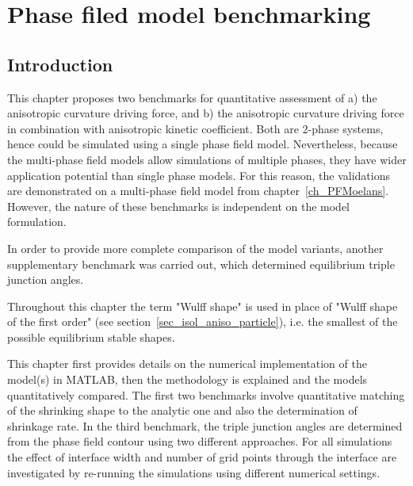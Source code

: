 \chapter{Phase filed model benchmarking}

\section{Introduction}
\label{sec_P1_Intro}

This chapter proposes two benchmarks for quantitative assessment of a) the anisotropic curvature driving force, and b) the anisotropic curvature driving force in combination with anisotropic kinetic coefficient. Both are 2-phase systems, hence could be simulated using a single phase field model. Nevertheless, because the multi-phase field models allow simulations of multiple phases, they have wider application potential than single phase models. For this reason, the validations are demonstrated on a multi-phase field model from chapter~\ref{ch_PFMoelans}. However, the nature of these benchmarks is independent on the model formulation. 

In order to provide more complete comparison of the model variants, another supplementary benchmark was carried out, which determined equilibrium triple junction angles.

Throughout this chapter the term "Wulff shape" is used in place of "Wulff shape of the first order" (see section~\ref{sec_isol_aniso_particle}), i.e. the smallest of the possible equilibrium stable shapes. 

This chapter first provides details on the numerical implementation of the model(s) in MATLAB, then the methodology is explained and the models quantitatively compared. The first two benchmarks involve quantitative matching of the shrinking shape to the analytic one and also the determination of shrinkage rate. In the third benchmark, the triple junction angles are determined from the phase field contour using two different approaches. For all simulations the effect of interface width and number of grid points through the interface are investigated by re-running the simulations using different numerical settings.


